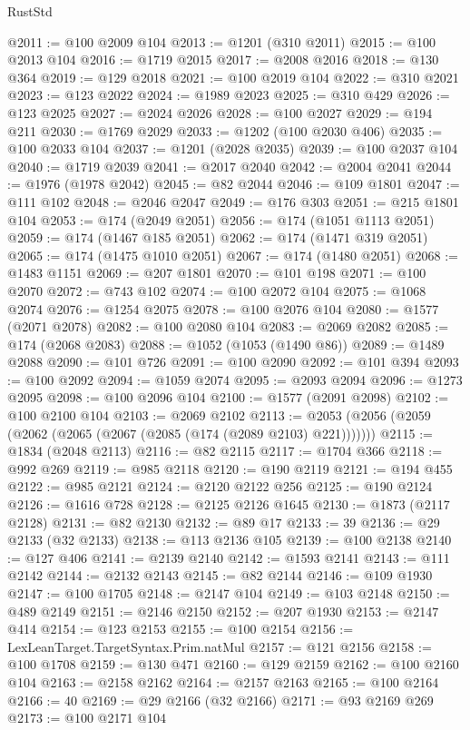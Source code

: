 \begin{lexlean}{RustStd}
\begin{coremodule}
@2011 := @100 @2009 @104
@2013 := @1201 (@310 @2011)
@2015 := @100 @2013 @104
@2016 := @1719 @2015
@2017 := @2008 @2016
@2018 := @130 @364
@2019 := @129 @2018
@2021 := @100 @2019 @104
@2022 := @310 @2021
@2023 := @123 @2022
@2024 := @1989 @2023
@2025 := @310 @429
@2026 := @123 @2025
@2027 := @2024 @2026
@2028 := @100 @2027
@2029 := @194 @211
@2030 := @1769 @2029
@2033 := @1202 (@100 @2030 @406)
@2035 := @100 @2033 @104
@2037 := @1201 (@2028 @2035)
@2039 := @100 @2037 @104
@2040 := @1719 @2039
@2041 := @2017 @2040
@2042 := @2004 @2041
@2044 := @1976 (@1978 @2042)
@2045 := @82 @2044
@2046 := @109 @1801
@2047 := @111 @102
@2048 := @2046 @2047
@2049 := @176 @303
@2051 := @215 @1801 @104
@2053 := @174 (@2049 @2051)
@2056 := @174 (@1051 @1113 @2051)
@2059 := @174 (@1467 @185 @2051)
@2062 := @174 (@1471 @319 @2051)
@2065 := @174 (@1475 @1010 @2051)
@2067 := @174 (@1480 @2051)
@2068 := @1483 @1151
@2069 := @207 @1801
@2070 := @101 @198
@2071 := @100 @2070
@2072 := @743 @102
@2074 := @100 @2072 @104
@2075 := @1068 @2074
@2076 := @1254 @2075
@2078 := @100 @2076 @104
@2080 := @1577 (@2071 @2078)
@2082 := @100 @2080 @104
@2083 := @2069 @2082
@2085 := @174 (@2068 @2083)
@2088 := @1052 (@1053 (@1490 @86))
@2089 := @1489 @2088
@2090 := @101 @726
@2091 := @100 @2090
@2092 := @101 @394
@2093 := @100 @2092
@2094 := @1059 @2074
@2095 := @2093 @2094
@2096 := @1273 @2095
@2098 := @100 @2096 @104
@2100 := @1577 (@2091 @2098)
@2102 := @100 @2100 @104
@2103 := @2069 @2102
@2113 := @2053 (@2056 (@2059 (@2062 (@2065 (@2067 (@2085 (@174 (@2089 @2103) @221)))))))
@2115 := @1834 (@2048 @2113)
@2116 := @82 @2115
@2117 := @1704 @366
@2118 := @992 @269
@2119 := @985 @2118
@2120 := @190 @2119
@2121 := @194 @455
@2122 := @985 @2121
@2124 := @2120 @2122 @256
@2125 := @190 @2124
@2126 := @1616 @728
@2128 := @2125 @2126 @1645
@2130 := @1873 (@2117 @2128)
@2131 := @82 @2130
@2132 := @89 @17
@2133 := 39
@2136 := @29 @2133 (@32 @2133)
@2138 := @113 @2136 @105
@2139 := @100 @2138
@2140 := @127 @406
@2141 := @2139 @2140
@2142 := @1593 @2141
@2143 := @111 @2142
@2144 := @2132 @2143
@2145 := @82 @2144
@2146 := @109 @1930
@2147 := @100 @1705
@2148 := @2147 @104
@2149 := @103 @2148
@2150 := @489 @2149
@2151 := @2146 @2150
@2152 := @207 @1930
@2153 := @2147 @414
@2154 := @123 @2153
@2155 := @100 @2154
@2156 := LexLeanTarget.TargetSyntax.Prim.natMul
@2157 := @121 @2156
@2158 := @100 @1708
@2159 := @130 @471
@2160 := @129 @2159
@2162 := @100 @2160 @104
@2163 := @2158 @2162
@2164 := @2157 @2163
@2165 := @100 @2164
@2166 := 40
@2169 := @29 @2166 (@32 @2166)
@2171 := @93 @2169 @269
@2173 := @100 @2171 @104

\end{coremodule}
\end{lexlean}
